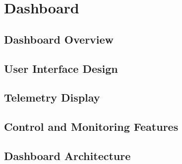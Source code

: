 \chapter{Dashboard}

\section{Dashboard Overview}

\section{User Interface Design}

\section{Telemetry Display}

\section{Control and Monitoring Features}

\section{Dashboard Architecture}
